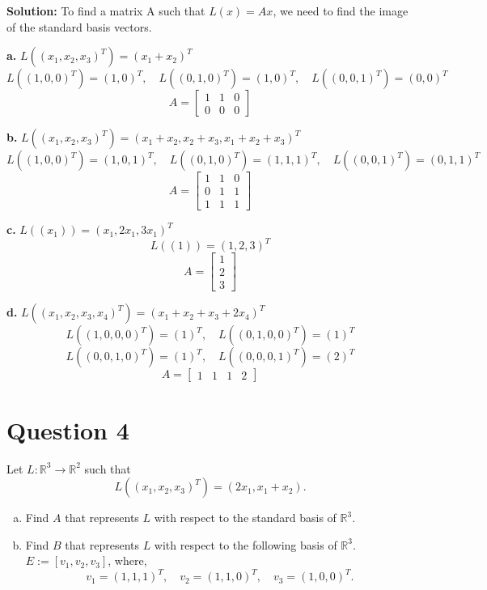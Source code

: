 \documentclass{article}
\begin{document}
\noindent\textbf{Solution:} To find a matrix A such that $L(x) = Ax$, we need to find the image of the standard basis vectors.

\vspace{0.25cm}
\noindent\textbf{a.} $ L((x_1, x_2, x_3)^T) = (x_1 + x_2)^T $ \\
$$ L((1, 0, 0)^T) = (1, 0)^T, \quad L((0, 1, 0)^T) = (1, 0)^T, \quad L((0, 0, 1)^T) = (0, 0)^T $$
$$ A = \begin{bmatrix} 1 & 1 & 0 \\ 0 & 0 & 0 \end{bmatrix} $$

\vspace{0.25cm}
\noindent\textbf{b.} $ L((x_1, x_2, x_3)^T) = (x_1 + x_2, x_2 + x_3, x_1 + x_2 + x_3)^T $ \\
$$ L((1, 0, 0)^T) = (1, 0, 1)^T, \quad L((0, 1, 0)^T) = (1, 1, 1)^T, \quad L((0, 0, 1)^T) = (0, 1, 1)^T $$
$$ A = \begin{bmatrix} 1 & 1 & 0 \\ 0 & 1 & 1 \\ 1 & 1 & 1 \end{bmatrix} $$

\vspace{0.25cm}
\noindent\textbf{c.} $ L((x_1)) = (x_1, 2x_1, 3x_1)^T $ \\
$$ L((1)) = (1, 2, 3)^T $$
$$ A = \begin{bmatrix} 1 \\ 2 \\ 3 \end{bmatrix} $$

\vspace{0.25cm}
\noindent\textbf{d.} $ L((x_1, x_2, x_3, x_4)^T) = (x_1 + x_2 + x_3 + 2x_4)^T $ \\
$$ L((1, 0, 0, 0)^T) = (1)^T, \quad L((0, 1, 0, 0)^T) = (1)^T $$
$$ L((0, 0, 1, 0)^T) = (1)^T, \quad L((0, 0, 0, 1)^T) = (2)^T $$
$$ A = \begin{bmatrix} 1 & 1 & 1 & 2 \end{bmatrix} $$


\section*{Question 4}
Let $L : \mathbb{R}^3 \to \mathbb{R}^2$ such that
$$ L((x_1, x_2, x_3)^T) = (2x_1, x_1 + x_2). $$
\begin{enumerate}[a.]
    \item Find $A$ that represents $L$ with respect to the standard basis of $\mathbb{R}^3$.
    \item Find $B$ that represents $L$ with respect to the following basis of $\mathbb{R}^3$. \\
    $E := [v_1, v_2, v_3]$, where, $$ v_1 = (1,1,1)^T, \quad v_2 = (1,1,0)^T, \quad v_3 = (1,0,0)^T. $$
\end{enumerate}
\end{document}
